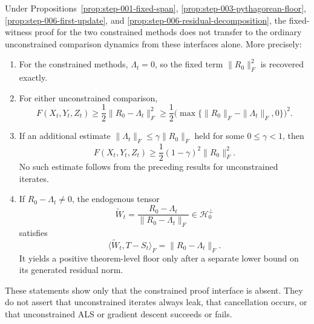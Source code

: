\begin{proposition}\label{prop:step-006-nontransfer}
Under Propositions~\ref{prop:step-001-fixed-span},
\ref{prop:step-003-pythagorean-floor},
\ref{prop:step-006-first-update}, and
\ref{prop:step-006-residual-decomposition}, the fixed-witness proof for the
two constrained methods does not transfer to the ordinary unconstrained
comparison dynamics from these interfaces alone.  More precisely:
\begin{enumerate}[label=(\roman*)]
 \item For the constrained methods, $\Lambda_t=0$, so the fixed term
 $\|R_0\|_F^2$ is recovered exactly.
 \item For either unconstrained comparison,
 \[
 F(X_t,Y_t,Z_t)
 \ge\frac12\|R_0-\Lambda_t\|_F^2
 \ge\frac12\bigl(\max\{\|R_0\|_F-\|\Lambda_t\|_F,0\}\bigr)^2.
 \]
 \item If an additional estimate
 $\|\Lambda_t\|_F\le\gamma\|R_0\|_F$ held for some $0\le\gamma<1$, then
 \[
 F(X_t,Y_t,Z_t)\ge\frac12(1-\gamma)^2\|R_0\|_F^2.
 \]
 No such estimate follows from the preceding results for unconstrained
 iterates.
 \item If $R_0-\Lambda_t\ne0$, the endogenous tensor
 \[
 \widetilde W_t=\frac{R_0-\Lambda_t}{\|R_0-\Lambda_t\|_F}
 \in\mathcal H_0^\perp
 \]
 satisfies
 \[
 \langle\widetilde W_t,T-S_t\rangle_F=\|R_0-\Lambda_t\|_F.
 \]
 It yields a positive theorem-level floor only after a separate lower bound
 on its generated residual norm.
\end{enumerate}
These statements show only that the constrained proof interface is absent.
They do not assert that unconstrained iterates always leak, that cancellation
occurs, or that unconstrained ALS or gradient descent succeeds or fails.
\end{proposition}

